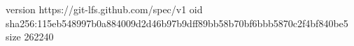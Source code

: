 version https://git-lfs.github.com/spec/v1
oid sha256:115eb548997b0a884009d2d46b97b9dff89bb58b70bf6bbb5870c2f4bf840be5
size 262240
